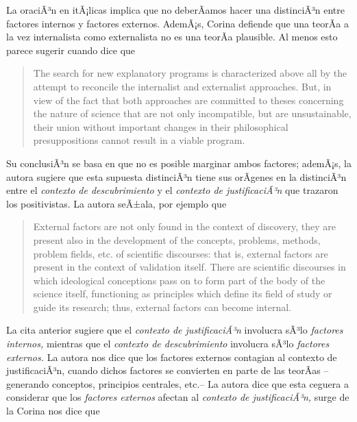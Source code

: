 La oraciÃ³n en itÃ¡licas implica que no deberÃ­amos hacer una distinciÃ³n entre factores internos y factores externos.
AdemÃ¡s, Corina defiende que una teorÃ­a a la vez internalista como externalista no es una teorÃ­a plausible.
Al menos esto parece sugerir cuando dice que

\begin{quote}
	The search for new explanatory programs is characterized above all by the attempt to reconcile the internalist and externalist approaches.
	But, in view of the fact that both approaches are committed to theses concerning the nature of science that are not only incompatible, but are unsustainable, their union without important changes in their philosophical presuppositions cannot result in a viable program. \parencite[p. 79]{Yturbe1995}
\end{quote}

Su conclusiÃ³n se basa en que no es posible marginar ambos factores; ademÃ¡s, la autora sugiere que esta supuesta distinciÃ³n tiene sus orÃ­genes en la distinciÃ³n entre el \emph{contexto de descubrimiento} y el \emph{contexto de justificaciÃ³n} que trazaron los positivistas.
La autora seÃ±ala, por ejemplo que

\begin{quote}
	External factors are not only found in the context of discovery, they are present also in the development of the concepts, problems, methods, problem fields, etc. of scientific discourses: that is, external factors are present in the context of validation itself.
	There are scientific discourses in which ideological conceptions pass on to form part of the body of the science itself, functioning as principles which define its field of study or guide its research; thus, external factors can become internal. \parencite[p. 85]{Yturbe1995}
\end{quote}

La cita anterior sugiere que el \emph{contexto de justificaciÃ³n} involucra sÃ³lo \emph{factores internos,} mientras que el \emph{contexto de descubrimiento} involucra sÃ³lo \emph{factores externos.}
La autora nos dice que los factores externos contagian al contexto de justificaciÃ³n, cuando dichos factores se convierten en parte de las teorÃ­as --generando conceptos, principios centrales, etc.--
La autora dice que esta ceguera a considerar que los \emph{factores externos} afectan al \emph{contexto de justificaciÃ³n,} surge de la 
Corina nos dice que  \parencite[p. 75]{Yturbe1995}


